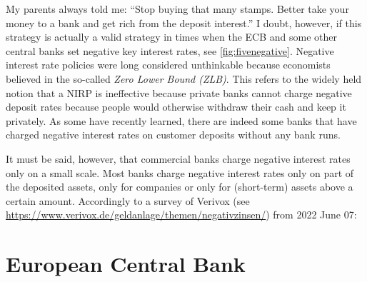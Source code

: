 My parents always told me: ``Stop buying that many stamps. Better take your money to a bank and get rich from the deposit interest.'' 
I doubt, however, if this strategy is actually a valid strategy in times when the ECB and some other central banks set negative key interest rates, see \autoref{fig:fivenegative}. 
Negative interest rate policies were long considered unthinkable because economists believed in the so-called \textit{Zero Lower Bound (ZLB)}. This refers to the widely held notion that a NIRP is ineffective because private banks cannot charge negative deposit rates because people would otherwise withdraw their cash and keep it privately. As some have recently learned, there are indeed some banks that have charged negative interest rates on customer deposits without any bank runs. 

It must be said, however, that commercial banks charge negative interest rates only on a small scale. Most banks charge negative interest rates only on part of the deposited assets, only for companies or only for (short-term) assets above a certain amount. Accordingly to a survey of Verivox (see \url{https://www.verivox.de/geldanlage/themen/negativzinsen/}) from 2022 June 07:
%




\section{European Central Bank}

